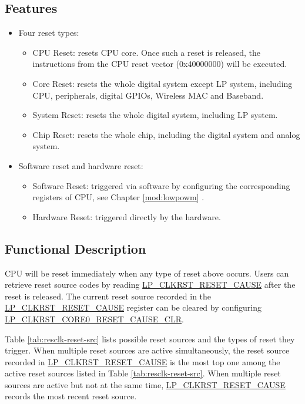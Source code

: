 \documentclass[main\_\_EN.tex]{subfiles}
\begin{document}
\subsection{Features}
\label{sec:resclk-features}
\begin{itemize}
    \item Four reset types:
    \begin{itemize}
    \item CPU Reset: resets CPU core. Once such a reset is released, the instructions from the CPU reset vector (0x40000000)  will be executed.
    \item Core Reset: resets the whole digital system except LP system, including CPU, peripherals, digital GPIOs, Wireless MAC and Baseband.
    \item System Reset: resets the whole digital system, including LP system.
    \item Chip Reset: resets the whole chip, including the digital system and analog system.
    \end{itemize}
    \item Software reset and hardware reset:
    \begin{itemize}
        \item Software Reset: triggered via software by configuring the corresponding registers of CPU, see Chapter \ref{mod:lowpowm} \textit{}.
        \item Hardware Reset: triggered directly by the hardware.
    \end{itemize}
\end{itemize}

\subsection{Functional Description}
CPU will be reset immediately when any type of reset above occurs. Users can retrieve reset source codes by reading  \hyperref[fielddesc:LPCLKRSTRESETCAUSE]{LP\_CLKRST\_RESET\_CAUSE} after the reset is released. The current reset source recorded in the \hyperref[fielddesc:LPCLKRSTRESETCAUSE]{LP\_CLKRST\_RESET\_CAUSE} register can be cleared by configuring \hyperref[fielddesc:LPCLKRSTCORE0RESETCAUSECLR]{LP\_CLKRST\_CORE0\_RESET\_CAUSE\_CLR}.

Table \ref{tab:resclk-reset-src} lists possible reset sources and the types of reset they trigger. When multiple reset sources are active simultaneously, the reset source recorded in \hyperref[fielddesc:LPCLKRSTRESETCAUSE]{LP\_CLKRST\_RESET\_CAUSE} is the most top one among the active reset sources listed in Table \ref{tab:resclk-reset-src}. When multiple reset sources are active but not at the same time, \hyperref[fielddesc:LPCLKRSTRESETCAUSE]{LP\_CLKRST\_RESET\_CAUSE} records the most recent reset source.
\end{document}
